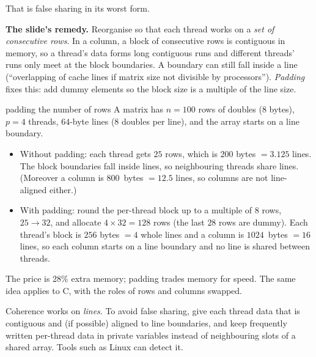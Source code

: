 \begin{center}
\end{center}

That is false sharing in its worst form.

\textbf{The slide's remedy.} Reorganise so that each thread works on a \emph{set of consecutive rows}. In a column, a block of consecutive rows
is contiguous in memory, so a thread's data forms long contiguous runs and different threads' runs only meet at the block boundaries.
A boundary can still fall inside a line (``overlapping of cache lines if matrix size not divisible by processors''). \emph{Padding} fixes this: add
dummy elements so the block size is a multiple of the line size.

\begin{workedex}{padding the number of rows}
A matrix has $n=100$ rows of doubles ($8$ bytes), $p=4$ threads, $64$-byte lines (8 doubles per line), and the array starts on a line boundary.
\begin{itemize}
  \item Without padding: each thread gets $25$ rows, which is $200$ bytes $=3.125$ lines. The block boundaries fall inside lines, so
        neighbouring threads share lines. (Moreover a column is $800$~bytes $=12.5$ lines, so columns are not line-aligned either.)
  \item With padding: round the per-thread block up to a multiple of $8$ rows, $25\to 32$, and allocate $4\times 32 = 128$ rows
        (the last $28$ rows are dummy). Each thread's block is $256$ bytes $=4$ whole lines and a column is $1024$~bytes
        $=16$ lines, so each column starts on a line boundary and no line is shared between threads.
\end{itemize}
The price is $28\%$ extra memory; padding trades memory for speed. The same idea applies to C, with the roles of rows and columns swapped.
\end{workedex}

\begin{keyidea}
Coherence works on \emph{lines}. To avoid false sharing, give each thread data that is contiguous and (if possible) aligned to line boundaries,
and keep frequently written per-thread data in private variables instead of neighbouring slots of a shared array. Tools such as Linux
 can detect it.
\end{keyidea}

